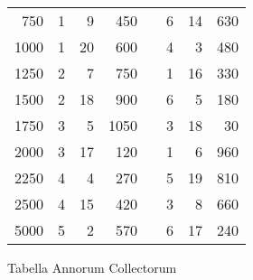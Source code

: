 \begin{tabnums}
\begin{tabular}[c]{@{} r rrr c rrr @{}}
 750 & 1 &  9 &  450 && 6 & 14 &  630 \\
1000 & 1 & 20 &  600 && 4 &  3 &  480 \\
1250 & 2 &  7 &  750 && 1 & 16 &  330 \\
1500 & 2 & 18 &  900 && 6 &  5 &  180 \\
1750 & 3 &  5 & 1050 && 3 & 18 &   30 \\
2000 & 3 & 17 &  120 && 1 &  6 &  960 \\
2250 & 4 &  4 &  270 && 5 & 19 &  810 \\
2500 & 4 & 15 &  420 && 3 &  8 &  660 \\
5000 & 5 &  2 &  570 && 6 & 17 &  240 \\
\bottomrule
\end{tabular}
\caption{Tabella Annorum Collectorum}
\label{tab:p193c}
\end{tabnums}

